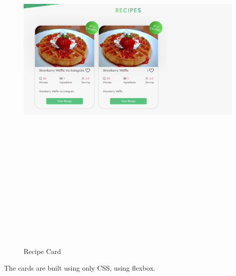 \begin{figure}[!hb]
\centering
\caption[Recipe Card]{Recipe Card}%
\label{fig:recipe_card}
\includegraphics[width=\linewidth,height=20cm,keepaspectratio]{img/recipe_card}
\end{figure}

The cards are built using only CSS, using flexbox.

\clearpage

